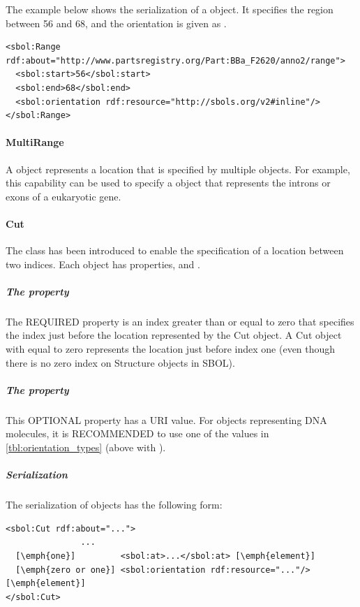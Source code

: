 The example below shows the serialization of a  object. It specifies the region between 56 and 68, and the orientation is given as .
\begin{lstlisting}
<sbol:Range rdf:about="http://www.partsregistry.org/Part:BBa_F2620/anno2/range">
  <sbol:start>56</sbol:start>
  <sbol:end>68</sbol:end>
  <sbol:orientation rdf:resource="http://sbols.org/v2#inline"/>
</sbol:Range>
\end{lstlisting}

\paragraph{MultiRange}
\label{sec:MultiRange}
A  object represents a location that is specified by multiple  objects. For example, this capability can be used to specify a  object that represents the introns or exons of a eukaryotic gene.

\paragraph{Cut}
\label{sec:Cut}
The  class has been introduced to enable the specification of a location between two indices. 
Each  object has properties,  and .

\subparagraph{The  property}
\label{sec:at}
The REQUIRED  property is an index greater than or equal to zero that specifies the index just before the location represented by the Cut object. 
A Cut object with  equal to zero represents the location just before index one (even though there is no zero index on Structure objects in SBOL). 

\subparagraph{The  property}
This OPTIONAL property has a URI value. For  objects representing DNA molecules, it is RECOMMENDED to use one of the values in \ref{tbl:orientation_types} (above with ).

\subparagraph{Serialization}

The serialization of  objects has the following form:
\begin{lstlisting}
<sbol:Cut rdf:about="...">
               ...   
  [\emph{one}]         <sbol:at>...</sbol:at> [\emph{element}] 
  [\emph{zero or one}] <sbol:orientation rdf:resource="..."/> [\emph{element}] 
</sbol:Cut>
\end{lstlisting}

